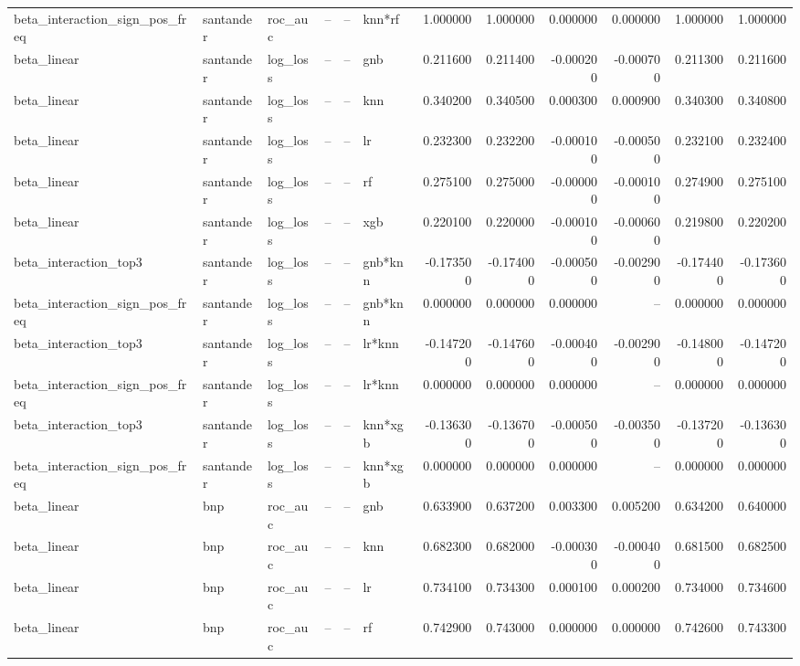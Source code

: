\begin{landscape}
\begin{longtable}{llllllrrrrrr}
beta\_interaction\_sign\_pos\_freq & santander & roc\_auc & -- & -- & knn*rf & 1.000000 & 1.000000 & 0.000000 & 0.000000 & 1.000000 & 1.000000 \\
beta\_linear & santander & log\_loss & -- & -- & gnb & 0.211600 & 0.211400 & -0.000200 & -0.000700 & 0.211300 & 0.211600 \\
beta\_linear & santander & log\_loss & -- & -- & knn & 0.340200 & 0.340500 & 0.000300 & 0.000900 & 0.340300 & 0.340800 \\
beta\_linear & santander & log\_loss & -- & -- & lr & 0.232300 & 0.232200 & -0.000100 & -0.000500 & 0.232100 & 0.232400 \\
beta\_linear & santander & log\_loss & -- & -- & rf & 0.275100 & 0.275000 & -0.000000 & -0.000100 & 0.274900 & 0.275100 \\
beta\_linear & santander & log\_loss & -- & -- & xgb & 0.220100 & 0.220000 & -0.000100 & -0.000600 & 0.219800 & 0.220200 \\
beta\_interaction\_top3 & santander & log\_loss & -- & -- & gnb*knn & -0.173500 & -0.174000 & -0.000500 & -0.002900 & -0.174400 & -0.173600 \\
beta\_interaction\_sign\_pos\_freq & santander & log\_loss & -- & -- & gnb*knn & 0.000000 & 0.000000 & 0.000000 & -- & 0.000000 & 0.000000 \\
beta\_interaction\_top3 & santander & log\_loss & -- & -- & lr*knn & -0.147200 & -0.147600 & -0.000400 & -0.002900 & -0.148000 & -0.147200 \\
beta\_interaction\_sign\_pos\_freq & santander & log\_loss & -- & -- & lr*knn & 0.000000 & 0.000000 & 0.000000 & -- & 0.000000 & 0.000000 \\
beta\_interaction\_top3 & santander & log\_loss & -- & -- & knn*xgb & -0.136300 & -0.136700 & -0.000500 & -0.003500 & -0.137200 & -0.136300 \\
beta\_interaction\_sign\_pos\_freq & santander & log\_loss & -- & -- & knn*xgb & 0.000000 & 0.000000 & 0.000000 & -- & 0.000000 & 0.000000 \\
beta\_linear & bnp & roc\_auc & -- & -- & gnb & 0.633900 & 0.637200 & 0.003300 & 0.005200 & 0.634200 & 0.640000 \\
beta\_linear & bnp & roc\_auc & -- & -- & knn & 0.682300 & 0.682000 & -0.000300 & -0.000400 & 0.681500 & 0.682500 \\
beta\_linear & bnp & roc\_auc & -- & -- & lr & 0.734100 & 0.734300 & 0.000100 & 0.000200 & 0.734000 & 0.734600 \\
beta\_linear & bnp & roc\_auc & -- & -- & rf & 0.742900 & 0.743000 & 0.000000 & 0.000000 & 0.742600 & 0.743300 \\

\end{longtable}
\end{landscape}
